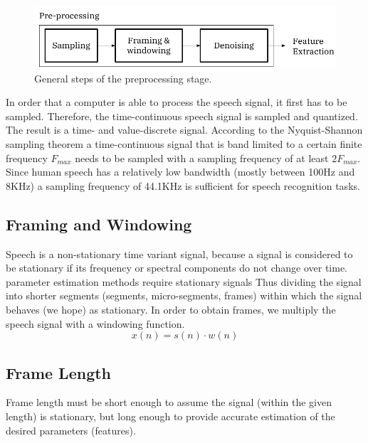 \documentclass[12pt, a4paper, twoside]{report}
\begin{document}
\begin{figure}[!h]
	\centering
	\includegraphics[]
	{images/chapter2/general-pre-steps}
	\caption{General steps of the preprocessing stage.}
	\label{fig:general-pre-steps}
\end{figure}

In order that a computer is able to process the speech signal, it first has to be sampled. Therefore, the time-continuous speech signal is sampled and quantized. The result is a time- and value-discrete signal. According to the Nyquist-Shannon sampling theorem a time-continuous signal that is band limited to a certain finite frequency $F_{max}$ needs to be sampled with a sampling frequency of at least $2F_{max}$. Since human speech has a relatively low bandwidth (mostly between 100Hz and 8KHz) a sampling frequency of 44.1KHz is sufficient for speech recognition tasks.

\subsection{Framing and Windowing}
Speech is a non-stationary time variant signal, because a signal is considered to be stationary if its frequency or spectral components do not change over time. parameter estimation methods require stationary signals Thus dividing the signal into shorter segments (segments, micro-segments, frames) within which the signal behaves (we hope) as stationary. In order to obtain frames, we multiply the speech signal with a windowing function.
\begin{equation}
x(n) = s(n) \cdot w(n)
\end{equation}
\subsection{Frame Length}
Frame length must be short enough to assume the signal (within the given length) is stationary, but long enough to provide accurate estimation of the desired parameters (features).
\end{document}

